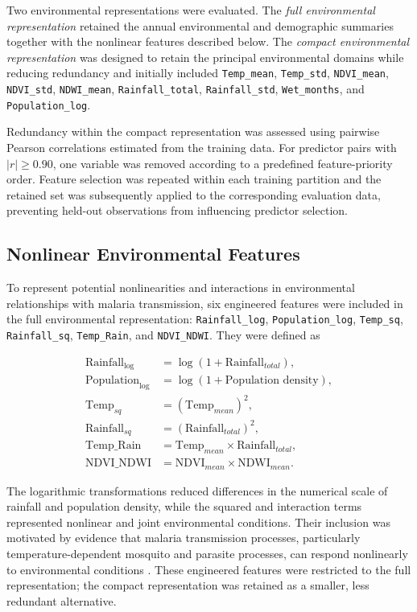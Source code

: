 \documentclass[10pt,twocolumn]{article}
\begin{document}
Two environmental representations were evaluated. The \emph{full
environmental representation} retained the annual environmental and
demographic summaries together with the nonlinear features described
below. The \emph{compact environmental representation} was designed to
retain the principal environmental domains while reducing redundancy
and initially included \texttt{Temp\_mean}, \texttt{Temp\_std},
\texttt{NDVI\_mean}, \texttt{NDVI\_std}, \texttt{NDWI\_mean},
\texttt{Rainfall\_total}, \texttt{Rainfall\_std},
\texttt{Wet\_months}, and \texttt{Population\_log}.

Redundancy within the compact representation was assessed using
pairwise Pearson correlations estimated from the training data. For
predictor pairs with \(\lvert r\rvert \geq 0.90\), one variable was
removed according to a predefined feature-priority order. Feature
selection was repeated within each training partition and the retained
set was subsequently applied to the corresponding evaluation data,
preventing held-out observations from influencing predictor selection.


\subsection{Nonlinear Environmental Features}

To represent potential nonlinearities and interactions in
environmental relationships with malaria transmission, six engineered
features were included in the full environmental representation:
\texttt{Rainfall\_log}, \texttt{Population\_log},
\texttt{Temp\_sq}, \texttt{Rainfall\_sq},
\texttt{Temp\_Rain}, and \texttt{NDVI\_NDWI}. They were defined as

\begin{align}
\text{Rainfall}_{\log}
&= \log(1+\text{Rainfall}_{total}), \\
\text{Population}_{\log}
&= \log(1+\text{Population density}), \\
\text{Temp}_{sq}
&= (\text{Temp}_{mean})^2, \\
\text{Rainfall}_{sq}
&= (\text{Rainfall}_{total})^2, \\
\text{Temp\_Rain}
&= \text{Temp}_{mean}\times\text{Rainfall}_{total}, \\
\text{NDVI\_NDWI}
&= \text{NDVI}_{mean}\times\text{NDWI}_{mean}.
\end{align}

The logarithmic transformations reduced differences in the numerical
scale of rainfall and population density, while the squared and
interaction terms represented nonlinear and joint environmental
conditions. Their inclusion was motivated by evidence that malaria
transmission processes, particularly temperature-dependent mosquito
and parasite processes, can respond nonlinearly to environmental
conditions \parencite{Villena2022,Suh2024,Dahlin2024}. These engineered
features were restricted to the full representation; the compact
representation was retained as a smaller, less redundant alternative.
\end{document}
